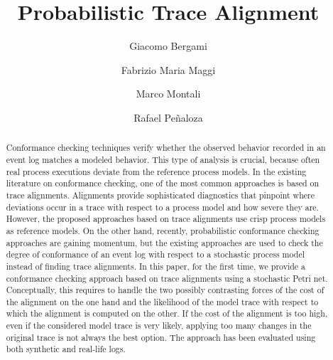 \documentclass[runningheads,final]{llncs}
\begin{document}
%
\title{Probabilistic Trace Alignment}
%
%
\author{
	Giacomo Bergami \and
	Fabrizio Maria Maggi \and
	Marco Montali \and
	Rafael Pe\~naloza}

%

%
%
\maketitle              %

\begin{abstract}
Conformance checking techniques verify whether the observed behavior recorded in an event log matches a modeled behavior. This type of analysis is crucial, because often real process executions deviate from the reference process models. In the existing literature on conformance checking, one of the most common approaches is based on trace alignments. Alignments provide sophisticated diagnostics that pinpoint where deviations occur in a trace with respect to a process model and how severe they are. However, the proposed approaches based on trace alignments use crisp process models as reference models. On the other hand, recently, probabilistic conformance checking approaches are gaining momentum, but the existing approaches are used to check the degree of conformance of an event log with respect to a stochastic process model instead of finding trace alignments.
In this paper, for the first time, we provide a conformance checking approach based on trace alignments using a stochastic Petri net. Conceptually, this requires to handle the two possibly contrasting forces of the cost of the alignment on the one hand and the likelihood of the model trace with respect to which the alignment is computed on the other. If the cost of the alignment is too high, even if the considered model trace is very likely, applying too many changes in the original trace is not always the best option. The approach has been evaluated using both synthetic and real-life logs.
\end{abstract}
\end{document}
